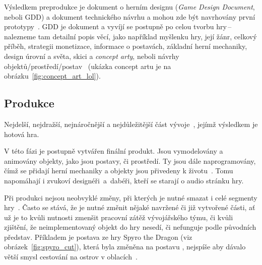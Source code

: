 Výsledkem preprodukce je dokument o herním designu (\textit{Game Design Document}, neboli GDD) a dokument technického návrhu a mohou zde být navrhovány první prototypy~\cite{novak2011game}. GDD je  dokument a vyvíjí se postupně po celou tvorbu hry\,--\,nalezneme tam detailní popis věcí, jako například myšlenku hry, její žánr, celkový příběh, strategii monetizace, informace o postavách, základní herní mechaniky, design úrovní a světa, skici a \textit{concept arty}, neboli návrhy objektů/prostředí/postav~\cite{CG_Spectrum_GAMEDEVELOPMENT} (ukázka concept artu je na obrázku~\ref{fig:concept_art_lol}).

\subsection*{Produkce}
Nejdelší, nejdražší, nejnáročnější a nejdůležitější část vývoje~\cite{g2_game_development}, jejímž výsledkem je hotová hra. 

V této fázi je postupně vytvářen finální produkt. Jsou vymodelovány a animovány objekty, jako jsou postavy, či prostředí. Ty  jsou dále naprogramovány, čímž se přidají herní mechaniky a objekty jsou přivedeny k životu~\cite{GameMaker_development}. Tomu napomáhají i zvukoví designéři~a~dabéři, kteří se starají o audio stránku hry.

Při produkci nejsou neobvyklé změny, při kterých je nutné smazat i celé segmenty hry~\cite{g2_game_development}. Často se stává, že je nutné změnit nějaké navržené či již vytvořené části, ať už je to kvůli nutnosti zmenšit pracovní zátěž vývojářského týmu, či kvůli zjištění, že neimplementovaný objekt do hry nesedí, či nefunguje podle původních představ. Příkladem je postava  ze hry Spyro the Dragon (viz obrázek~\ref{fig:spyro_cut}), která byla změněna na postavu , nejspíše aby dávalo větší smysl cestování na ostrov v oblacích~\cite{GameMaker_development}.

